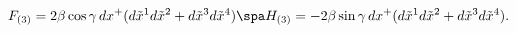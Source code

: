 \begin{equation}
\label{fluxppmix}
F_{(3)} = 2\beta \cos \gamma \, dx^+ ( d\tilde{x}^1 d\tilde{x}^2 
+ d\tilde{x}^3 d\tilde{x}^4 )
\spa
H_{(3)} = - 2\beta \sin \gamma \, dx^+ ( d\tilde{x}^1 d\tilde{x}^2 
+ d\tilde{x}^3 d\tilde{x}^4 ).
\end{equation}

